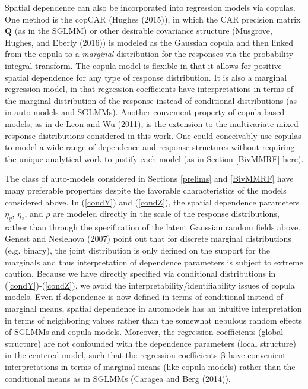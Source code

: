 \documentclass[12pt, a4paper, twoside]{article}
\begin{document}
Spatial dependence can also be incorporated into regression models via copulas. One method is the copCAR (Hughes (2015)), in which the CAR precision matrix $\textbf{Q}$ (as in the SGLMM)  or other desirable covariance structure (Musgrove, Hughes, and Eberly (2016)) is modeled as the Gaussian copula and then linked from the copula to a \textit{marginal} distribution for the responses via the probability integral transform. The copula model is flexible in that it allows for positive spatial dependence for any type of response distribution. It is also a marginal regression model, in that regression coefficients have interpretations in terms of the marginal distribution of the response instead of conditional distributions (as in auto-models and SGLMMs). Another convenient property of copula-based models, as in de Leon and Wu (2011), is the extension to the multivariate mixed response distributions considered in this work. One could conceivably use copulas to model a wide range of dependence and response structures without requiring the unique analytical work to justify each model (as in Section \ref{BivMMRF} here).

The class of auto-models considered in Sections \ref{prelims} and \ref{BivMMRF} have many preferable properties despite the favorable characteristics of the models considered above. In (\ref{condY}) and (\ref{condZ}), the spatial dependence parameters $\eta_{y}$, $\eta_{z}$, and $\rho$ are modeled directly in the scale of the response distributions, rather than through the specification of the latent Gaussian random fields above. Genest and Neslehova (2007) point out that for discrete marginal distributions (e.g. binary), the joint distribution is only defined on the support for the marginals and thus interpretation of dependence parameters is subject to extreme caution. Because we have directly specified via conditional distributions in (\ref{condY})-(\ref{condZ}), we avoid the interpretability/identifiability  issues of copula models. Even if dependence is now defined in terms of conditional instead of marginal means, spatial dependence in automodels has an intuitive interpretation in terms of neighboring values rather than the somewhat nebulous random effects of SGLMMs and copula models. Moreover, the regression coefficients (global structure) are not confounded with the dependence parameters (local structure) in the centered model, such that the regression coefficients $\boldsymbol{\beta}$ have convenient interpretations in terms of marginal means (like copula models) rather than the conditional means as in SGLMMs (Caragea and Berg (2014)).
\end{document}
